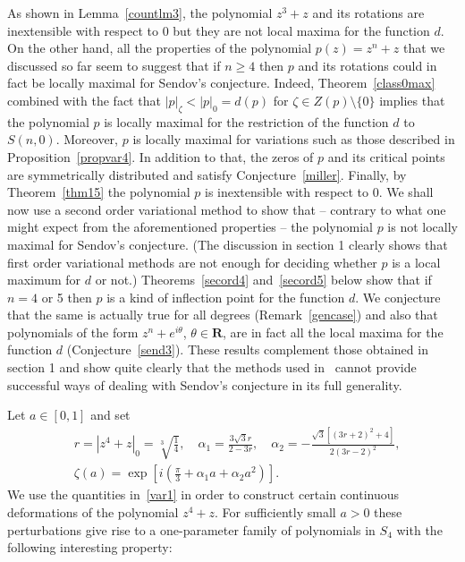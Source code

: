 \documentclass[10pt,twoside,a4paper,reqno]{amsart}
\theoremstyle{plain}
\theoremstyle{definition}
\begin{document}
{As shown in Lemma~\ref{countlm3}, the polynomial $z^3+z$ and its rotations are 
inextensible with respect to 0 but they are not local maxima for the function 
$d$. On the other hand, all the properties of the polynomial $p(z)=z^n+z$ 
that we discussed so far seem to suggest that if $n\ge 4$ then $p$ and its 
rotations could in 
fact be locally maximal for Sendov's conjecture. Indeed, 
Theorem~\ref{class0max} combined 
with the fact that $|p|_{\zeta}<|p|_0=d(p)$ for $\zeta\in Z(p)\setminus \{0\}$ 
implies that the polynomial $p$ is locally maximal for the restriction of the 
function $d$ to $S(n,0)$. Moreover, $p$ is locally maximal for variations such 
as those described in Proposition~\ref{propvar4}. In addition to that, the 
zeros of $p$ 
and its critical points are symmetrically distributed and satisfy 
Conjecture~\ref{miller}. Finally, by Theorem~\ref{thm15} the polynomial $p$ 
is inextensible with respect to 0. We shall now use a second order variational 
method to show that -- contrary to what one might expect from the 
aforementioned properties -- the polynomial $p$ is not locally maximal for 
Sendov's conjecture. (The discussion in section 1 clearly shows that first 
order variational methods are 
not enough for deciding whether $p$ is a local maximum for $d$ or not.) 
Theorems~\ref{secord4} and~\ref{secord5} below show that if $n=4$ or 5 then 
$p$ is a kind of inflection point for the function $d$. We conjecture that the 
same is actually true for all degrees (Remark~\ref{gencase}) and also that 
polynomials of the form $z^n+e^{i\theta}$, $\theta\in \mathbf{R}$, are in fact 
all the local maxima for the function $d$ (Conjecture~\ref{send3}). These
results complement those obtained in section 1 and show quite clearly that the 
methods used in~\cite{S1} cannot provide successful ways of dealing with 
Sendov's conjecture in its full generality. 

Let $a\in [0,1]$ and set
\begin{equation}\label{var1}
\begin{split}
&r=\left|z^4+z\right|_0=\sqrt[3]{\frac{1}{4}},
\quad \alpha_1=\frac{3\sqrt{3}r}{2-3r},\quad
\alpha_2=-\frac{\sqrt{3}\left[(3r+2)^2+4\right]}{2(3r-2)^2},\\
&\zeta(a)=\exp{\left[i\!\left(\frac{\pi}{3}+\alpha_1 a
+\alpha_2 a^2\right)\right]}.
\end{split}
\end{equation}
We use the quantities in~\eqref{var1} in order to construct certain continuous 
deformations of the polynomial $z^4+z$. For sufficiently small $a>0$ these  
perturbations give rise to a one-parameter 
family of polynomials in $S_4$ with the following interesting property:

}
\end{document}

